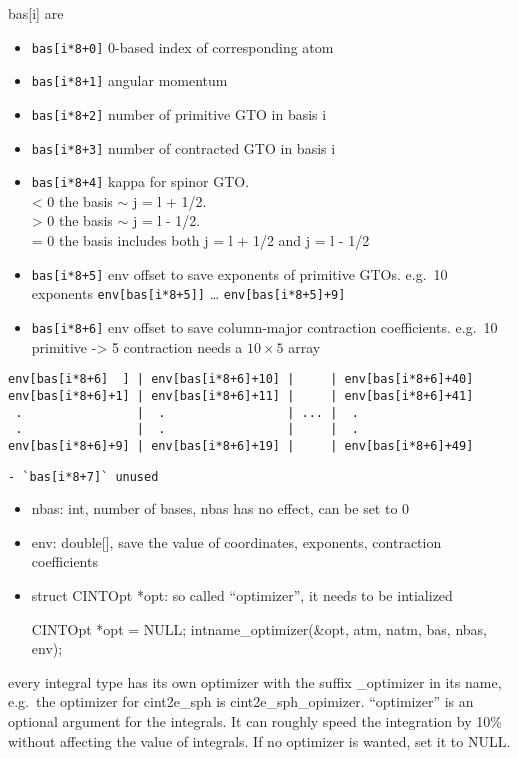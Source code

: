 \documentclass{article}
\begin{document}
\begin{itemize}
  bas[i] are
  \begin{itemize}
  \item
    \verb!bas[i*8+0]! 0-based index of corresponding atom
  \item
    \verb!bas[i*8+1]! angular momentum
  \item
    \verb!bas[i*8+2]! number of primitive GTO in basis i
  \item
    \verb!bas[i*8+3]! number of contracted GTO in basis i
  \item
    \verb!bas[i*8+4]! kappa for spinor GTO.\\ \textless{} 0 the basis
    \ensuremath{\sim} j = l + 1/2.\\ \textgreater{} 0 the basis
    \ensuremath{\sim} j = l - 1/2.\\ = 0 the basis includes both j = l
    + 1/2 and j = l - 1/2
  \item
    \verb!bas[i*8+5]! env offset to save exponents of primitive GTOs.
    e.g.~10 exponents \verb!env[bas[i*8+5]]! \ldots{}
    \verb!env[bas[i*8+5]+9]!
  \item
    \verb!bas[i*8+6]! env offset to save column-major contraction
    coefficients. e.g.~10 primitive -\textgreater{} 5 contraction needs
    a $10\times 5$ array
  \end{itemize}
\end{itemize}
\begin{verbatim}
env[bas[i*8+6]  ] | env[bas[i*8+6]+10] |     | env[bas[i*8+6]+40]
env[bas[i*8+6]+1] | env[bas[i*8+6]+11] |     | env[bas[i*8+6]+41]
 .                |  .                 | ... |  .                
 .                |  .                 |     |  .                
env[bas[i*8+6]+9] | env[bas[i*8+6]+19] |     | env[bas[i*8+6]+49]
\end{verbatim}
\begin{verbatim}
- `bas[i*8+7]` unused
\end{verbatim}
\begin{itemize}
\item
  nbas: int, number of bases, nbas has no effect, can be set to 0
\item
  env: double[], save the value of coordinates, exponents,
  contraction coefficients

\item
  struct CINTOpt *opt: so called ``optimizer'', it needs to be
  intialized

  CINTOpt *opt = NULL; intname\_optimizer(\&opt, atm, natm, bas,
  nbas, env);

\end{itemize}
every integral type has its own optimizer with the suffix
\_optimizer in its name, e.g.~the optimizer for cint2e\_sph is
cint2e\_sph\_opimizer. ``optimizer'' is an optional argument for
the integrals. It can roughly speed the integration by 10\% without
affecting the value of integrals. If no optimizer is wanted, set it
to NULL.
\end{document}

